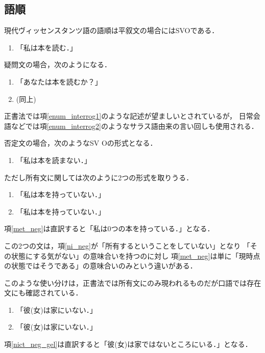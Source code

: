 \documentclass[a4paper,xelatex,ja=standard]{bxjsarticle}
\begin{document}
\subsection{語順}
現代ヴィッセンスタンツ語の語順は平叙文の場合にはSVOである．
\begin{enumerate}
 \item {} 「私は本を読む．」 
\end{enumerate}

疑問文の場合，次のようになる．
\begin{enumerate}
 \item {} 「あなたは本を読むか？」 \label{enum_interrog1}
 \item {} (同上) \label{enum_interrog2}
\end{enumerate}
正書法では項\ref{enum_interrog1}のような記述が望ましいとされているが，
日常会語などでは項\ref{enum_interrog2}のようなサラス語由来の言い回しも使用される．

否定文の場合，次のようなSV  Oの形式となる．
\begin{enumerate}
 \item {} 「私は本を読まない．」
\end{enumerate}
ただし所有文に関しては次のように2つの形式を取りうる．
\begin{enumerate}
 \item {} 「私は本を持っていない．」 \label{ni_neg}
 \item {} 「私は本を持っていない．」\label{met_neg}
\end{enumerate}
項\ref{met_neg}は直訳すると「私は0つの本を持っている．」となる．

この2つの文は，項\ref{ni_neg}が「所有するということをしていない」となり
「その状態にする気がない」の意味合いを持つのに対し
項\ref{met_neg}は単に「現時点の状態ではそうである」の意味合いのみという違いがある．

このような使い分けは，正書法では所有文にのみ現われるものだが口語では存在文にも確認されている．
\begin{enumerate}
 \item {} 「彼(女)は家にいない．」\label{ni_neg_gel}
 \item {} 「彼(女)は家にいない．」\label{nict_neg_gel}
\end{enumerate}
項\ref{nict_neg_gel}は直訳すると「彼(女)は家ではないところにいる．」となる．
\end{document}
